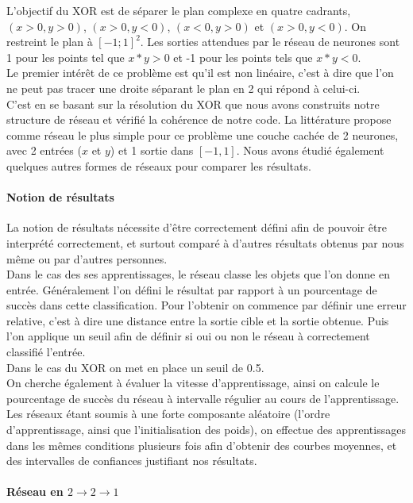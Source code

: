 L'objectif du XOR est de séparer le plan complexe en quatre cadrants, $(x >0, y > 0)$, $ (x>0, y<0)$, $ (x<0, y>0)$ et $ (x>0, y<0) $. On restreint le plan à $[-1;1]^2$. Les sorties attendues par le réseau de neurones sont 1 pour les points tel que $x*y > 0 $ et -1 pour les points tels que $x*y<0$. \\
Le premier intérêt de ce problème est qu'il est non linéaire, c'est à dire que l'on ne peut pas tracer une droite séparant le plan en 2 qui répond à celui-ci.\\

C'est en se basant sur la résolution du XOR que nous avons construits notre structure de réseau et vérifié la cohérence de notre code. La littérature propose comme réseau le plus simple pour ce problème une couche cachée de 2 neurones, avec 2 entrées ($x$ et $y$) et 1 sortie dans $[-1, 1]$. Nous avons étudié également quelques autres formes de réseaux pour comparer les résultats.

\paragraph{Notion de résultats} %
\label{par:notion_de_resultats}
La notion de résultats nécessite d'être correctement défini afin de pouvoir être interprété correctement, et surtout comparé à d'autres résultats obtenus par nous même ou par d'autres personnes. \\
Dans le cas des ses apprentissages, le réseau classe les objets que l'on donne en entrée. Généralement l'on défini le résultat par rapport à un pourcentage de succès dans cette classification. Pour l'obtenir on commence par définir une erreur relative, c'est à dire une distance entre la sortie cible et la sortie obtenue. Puis l'on applique un seuil afin de définir si oui ou non le réseau à correctement classifié l'entrée.\\
Dans le cas du XOR on met en place un seuil de 0.5.\\
On cherche également à évaluer la vitesse d'apprentissage, ainsi on calcule le pourcentage de succès du réseau à intervalle régulier au cours de l'apprentissage. Les réseaux étant soumis à une forte composante aléatoire (l'ordre d'apprentissage, ainsi que l'initialisation des poids), on effectue des apprentissages dans les mêmes conditions plusieurs fois afin d'obtenir des courbes moyennes, et des intervalles de confiances justifiant nos résultats.

\paragraph{Réseau en $2\rightarrow2\rightarrow1$} %

